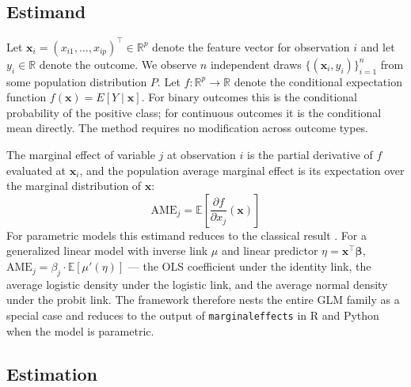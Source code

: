 \documentclass[conference]{IEEEtran}
\begin{document}
	
	
	\subsection{Estimand}
	
	Let $\mathbf{x}_i = (x_{i1}, \dots, x_{ip})^\top \in \mathbb{R}^p$ denote the feature vector for observation $i$ and let $y_i \in \mathbb{R}$ denote the outcome. We observe $n$ independent draws $\{(\mathbf{x}_i, y_i)\}_{i=1}^n$ from some population distribution $P$. Let $f: \mathbb{R}^p \to \mathbb{R}$ denote the conditional expectation function $f(\mathbf{x}) = E[Y \mid \mathbf{x}]$. For binary outcomes this is the conditional probability of the positive class; for continuous outcomes it is the conditional mean directly. The method requires no modification across outcome types.
	
	The marginal effect of variable $j$ at observation $i$ is the partial derivative of $f$ evaluated at $\mathbf{x}_i$, and the population average marginal effect is its expectation over the marginal distribution of $\mathbf{x}$:
	\begin{equation}
		\mathrm{AME}_j = \mathbb{E}\left[\frac{\partial f}{\partial x_j}(\mathbf{x})\right]
	\end{equation}
	For parametric models this estimand reduces to the classical result \cite{greene2012, wooldridge2010}. For a generalized linear model with inverse link $\mu$ and linear predictor $\eta = \mathbf{x}^\top \boldsymbol{\beta}$, $\mathrm{AME}_j = \beta_j \cdot \mathbb{E}[\mu'(\eta)]$ --- the OLS coefficient under the identity link, the average logistic density under the logistic link, and the average normal density under the probit link. The framework therefore nests the entire GLM family as a special case and reduces to the output of \texttt{marginaleffects} in R and Python \cite{arelbundock2024marginaleffects} when the model is parametric.
	
	\subsection{Estimation}
	
\end{document}
